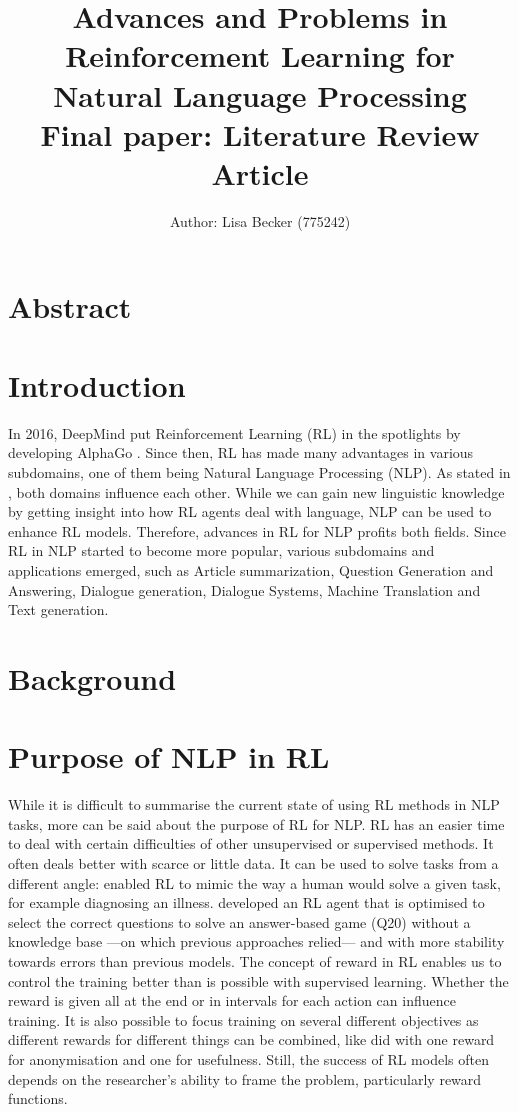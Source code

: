 \documentclass[11pt,a4paper]{article}
\title{{\LARGE Advances and Problems in Reinforcement Learning for Natural Language Processing}\\[1.5mm]
{\large Final paper: Literature Review Article}\\[1.5mm]}
\author{Author: Lisa Becker (775242) }
\begin{document}
\maketitle
\section{Abstract}


\section{Introduction}
In 2016, DeepMind put Reinforcement Learning (RL) in the spotlights by developing AlphaGo \citep{alphago}. Since then, RL has made many advantages in various subdomains, one of them being Natural Language Processing (NLP). As stated in \citet{ijcai2019}, both domains influence each other. While we can gain new linguistic knowledge by getting insight into how RL agents deal with language, NLP can be used to enhance RL models. Therefore, advances in RL for NLP profits both fields. Since RL in NLP started to become more popular, various subdomains and applications emerged, such as Article summarization, Question Generation and Answering, Dialogue generation, Dialogue Systems, Machine Translation and Text generation. 

\section{Background}

\section{Purpose of NLP in RL}
While it is difficult to summarise the current state of using RL methods in NLP tasks, more can be said about the purpose of RL for NLP. RL has an easier time to deal with certain difficulties of other unsupervised or supervised methods. It often deals better with scarce or little data. It can be used to solve tasks from a different angle: \citet{ling-etal-2017-learning} enabled RL to mimic the way a human would solve a given task, for example diagnosing an illness. \citet{hu-etal-2018-playing} developed an RL agent that is optimised to select the correct questions to solve an answer-based game (Q20) without a knowledge base ---on which previous approaches relied--- and with more stability towards errors than previous models. The concept of reward in RL enables us to control the training better than is possible with supervised learning. Whether the reward is given all at the end or in intervals for each action can influence training. It is also possible to focus training on several different objectives as different rewards for different things can be combined, like \citet{mosallanezhad-etal-2019-deep} did with one reward for anonymisation and one for usefulness. Still, the success of RL models often depends on the researcher's ability to frame the problem, particularly reward functions.
\end{document}
